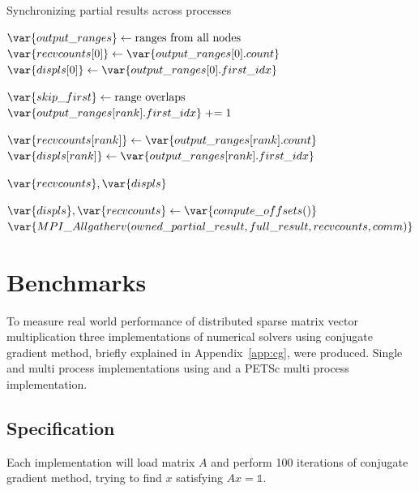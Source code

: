 \documentclass[thesis=M,english]{FITthesis}[2019/12/23]
\begin{document}
\newcommand{\pluseq}{\mathrel{+}=}
\begin{algorithm}[htp]
    \caption{Synchronizing partial results across processes}
    \begin{algorithmic}
        \State $\var{output\_ranges} \gets \text{ranges from all nodes}$
        \State $\var{recvcounts[0]} \gets \var{output\_ranges[0].count}$
        \State $\var{displs[0]} \gets \var{output\_ranges[0].first\_idx}$


        \State $\var{skip\_first} \gets \text{range overlaps}$
        \State $\var{output\_ranges[rank].first\_idx} \pluseq 1$
        \EndIf

        \State $\var{recvcounts[rank]} \gets \var{output\_ranges[rank].count}$
        \State $\var{displs[rank]} \gets \var{output\_ranges[rank].first\_idx}$

        \EndFor

        \Return $\var{recvcounts}, \var{displs}$

        \EndFunction

        \State $\var{displs}, \var{recvcounts} \gets \var{compute\_offsets()}$
        \State $\var{MPI\_Allgatherv(owned\_partial\_result, full\_result, recvcounts, comm)}$

        \EndFunction
    \end{algorithmic}
\end{algorithm}


\chapter{Benchmarks}

To measure real world performance of distributed sparse matrix vector multiplication
three implementations of numerical solvers using conjugate gradient method, briefly explained in
Appendix~\ref{app:cg}, were produced.
Single and multi process implementations using  and a PETSc multi process implementation.

\section{Specification}

Each implementation will load matrix $A$ and perform 100 iterations of conjugate
gradient method, trying to find $x$ satisfying $Ax=\mathbb{1}$.
\end{document}
